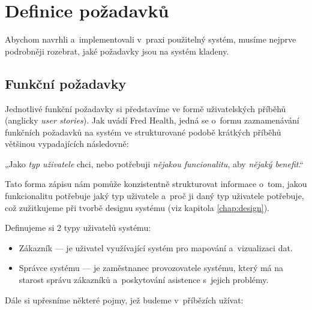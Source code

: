 
\chapter{Definice požadavků}\label{chap:requirements}

Abychom navrhli a~implementovali v~praxi použitelný systém, musíme nejprve podrobněji rozebrat, jaké požadavky jsou na systém kladeny. 

\section{Funkční požadavky}

Jednotlivé funkční požadavky si představíme ve formě uživatelských příběhů (anglicky \textit{user stories}).
Jak uvádí Fred Health, jedná se o~formu zaznamenávání funkčních požadavků na systém ve strukturované podobě krátkých příběhů většinou vypadajících následovně: 

„Jako \textit{typ uživatele} chci, nebo potřebuji \textit{nějakou funcionalitu}, aby \textit{nějaký benefit}.“\cite{userStories}  

Tato forma zápisu nám pomůže konzistentně strukturovat informace o~tom, jakou funkcionalitu potřebuje jaký typ uživatele a~proč ji daný typ uživatele potřebuje, což zužitkujeme při tvorbě designu systému (viz kapitola \ref{chap:design}).

Definujeme si 2 typy uživatelů systému:

\begin{itemize}
    \item Zákazník — je uživatel využívající systém pro mapování a~vizualizaci dat.
    \item Správce systému — je zaměstnanec provozovatele systému, který má na starost správu zákazníků a~poskytování asistence s~jejich problémy.
\end{itemize}

Dále si upřesníme některé pojmy, jež budeme v~příbězích užívat:

